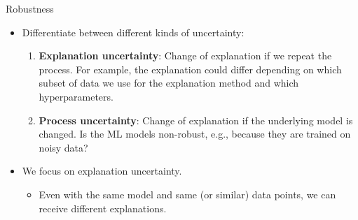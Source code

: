 \documentclass[11pt,compress,t,notes=noshow, aspectratio=169, xcolor=table]{beamer}
\begin{document}
\begin{vbframe}[c]{Robustness}
		\begin{itemize}
		\item Differentiate between different kinds of uncertainty: 
		\begin{enumerate}
			\item \textbf{Explanation uncertainty}: Change of explanation if we repeat the process. For example, the explanation could differ depending on which subset of data we use for the explanation method and which hyperparameters. 
			\item \textbf{Process uncertainty}: Change of explanation if the underlying model is changed. Is the ML models non-robust, e.g., because they are trained on noisy data?
		\end{enumerate}
		\item We focus on explanation uncertainty. 
		\begin{itemize}
		    \item Even with the same model and same (or similar) data points, we can receive different explanations.
		\end{itemize}
	\end{itemize}
\end{vbframe}
\end{document}
